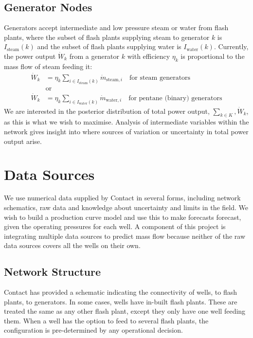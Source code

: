 \documentclass[a4paper, 12pt]{article}
\begin{document}
\subsection{Generator Nodes}
Generators accept intermediate and low pressure steam or water from flash plants, where the subset of flash plants supplying steam to generator $k$ is $I_{\text{steam}}(k)$ and the subset of flash plants supplying water is $I_{\text{water}}(k)$. Currently, the power output $\dot{W}_k$ from a generator $k$ with efficiency $\eta_k$ is proportional to the mass flow of steam feeding it:
\begin{align}
\dot{W}_k &= \eta_k \sum_{i\in I_{\text{steam}}(k)} \dot{m}_{\text{steam},i}\quad\text{for steam generators}\\
&\text{or}\\
\dot{W}_k &= \eta_k \sum_{i\in I_{\text{water}}(k)} \dot{m}_{\text{water},i}\quad\text{for pentane (binary) generators} \label{eq:power}
\end{align}
We are interested in the posterior distribution of total power output, $\sum_{k\in K}, \dot{W}_k$, as this is what we wish to maximise. Analysis of intermediate variables within the network gives insight into where sources of variation or uncertainty in total power output arise.

\section{Data Sources}
We use numerical data supplied by Contact in several forms, including network schematics, raw data and knowledge about uncertainty and limits in the field. We wish to build a production curve model and use this to make forecasts forecast, given the operating pressures for each well. A component of this project is integrating multiple data sources to predict mass flow because neither of the raw data sources covers all the wells on their own.

\subsection{Network Structure}
Contact has provided a schematic indicating the connectivity of wells, to flash plants, to generators. In some cases, wells have in-built flash plants. These are treated the same as any other flash plant, except they only have one well feeding them. When a well has the option to feed to several flash plants, the configuration is pre-determined by any operational decision.
\end{document}
